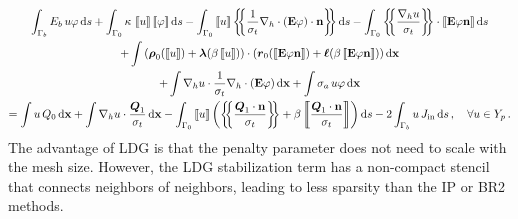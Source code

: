 \documentclass[../doc.tex]{subfiles}
\begin{document}
	\begin{multline} \label{dgvef:ldg}
		\int_{\Gamma_b} E_b\, u \varphi \ud s + \int_{\Gamma_0} \kappa\, \jump{u}\jump{\varphi} \ud s - \int_{\Gamma_0} \jump{u} \avg{\frac{1}{\sigma_t}\nablah\cdot\paren{\E\varphi}\cdot\n} \ud s - \int_{\Gamma_0} \avg{\frac{\nablah u}{\sigma_t}} \cdot \jump{\E\varphi\n} \ud s \\
		+ \int \paren{\vec{\rho}_0\!\paren{\jump{u}} + \vec{\lambda}\!\paren{\beta\jump{u}}}\cdot\paren{\vec{r}_0\!\paren{\jump{\E\varphi\n}} + \vec{\ell}\!\paren{\beta\jump{\E\varphi\n}}} \ud \x \\+ \int \nablah u \cdot \frac{1}{\sigma_t}\nablah\cdot\paren{\E\varphi} \ud \x + \int \sigma_a\, u \varphi \ud \x 
		\\= \int u\, Q_0 \ud \x + \int \nablah u \cdot \frac{\vec{Q}_1}{\sigma_t} \ud \x - \int_{\Gamma_0} \jump{u} \paren{\avg{\frac{\vec{Q}_1\cdot\n}{\sigma_t}} + \beta\jump{\frac{\vec{Q}_1\cdot\n}{\sigma_t}}} \ud s - 2\int_{\Gamma_b} u\, \Jin \ud s \,, \quad \forall u \in Y_p \,. 
	\end{multline}
The advantage of LDG is that the penalty parameter does not need to scale with the mesh size. However, the LDG stabilization term has a non-compact stencil that connects neighbors of neighbors, leading to less sparsity than the IP or BR2 methods. 
\end{document}
